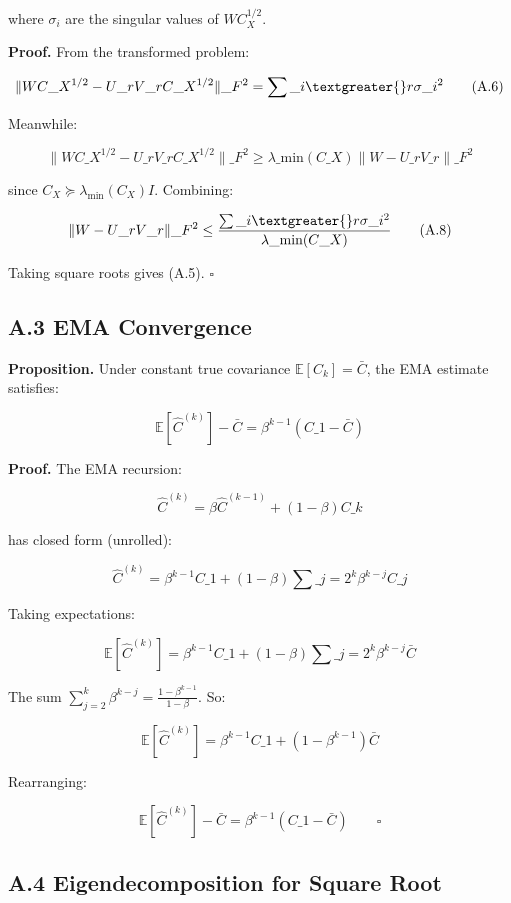 where $\sigma_i$ are the singular values of $W C_X^{1/2}$.

\textbf{Proof.} From the transformed problem:

\[
\|W C\_X^{1/2} - U\_r V\_r C\_X^{1/2}\|\_F^2 = \sum\_{i \textgreater{} r} \sigma\_i^2
\tag{A.6}
\]

Meanwhile:

\[
\|W C\_X^{1/2} - U\_r V\_r C\_X^{1/2}\|\_F^2 \geq \lambda\_\text{min}(C\_X) \|W - U\_r V\_r\|\_F^2
\tag{A.7}
\]

since $C_X \succeq \lambda_\text{min}(C_X) I$. Combining:

\[
\|W - U\_r V\_r\|\_F^2 \leq \frac{\sum\_{i \textgreater{} r} \sigma\_i^2}{\lambda\_\text{min}(C\_X)}
\tag{A.8}
\]

Taking square roots gives (A.5). $\square$

\subsection{A.3 EMA Convergence}

\textbf{Proposition.} Under constant true covariance $\mathbb{E}[C_k] = \bar{C}$, 
the EMA estimate satisfies:

\[
\mathbb{E}[\hat{C}^{(k)}] - \bar{C} = \beta^{k-1} (C\_1 - \bar{C})
\tag{A.9}
\]

\textbf{Proof.} The EMA recursion:

\[
\hat{C}^{(k)} = \beta \hat{C}^{(k-1)} + (1-\beta) C\_k
\]

has closed form (unrolled):

\[
\hat{C}^{(k)} = \beta^{k-1} C\_1 + (1-\beta) \sum\_{j=2}^{k} \beta^{k-j} C\_j
\]

Taking expectations:

\[
\mathbb{E}[\hat{C}^{(k)}] = \beta^{k-1} C\_1 + (1-\beta) \sum\_{j=2}^{k} \beta^{k-j} \bar{C}
\]

The sum $\sum_{j=2}^{k} \beta^{k-j} = \frac{1 - \beta^{k-1}}{1 - \beta}$. So:

\[
\mathbb{E}[\hat{C}^{(k)}] = \beta^{k-1} C\_1 + (1 - \beta^{k-1}) \bar{C}
\]

Rearranging:

\[
\mathbb{E}[\hat{C}^{(k)}] - \bar{C} = \beta^{k-1} (C\_1 - \bar{C}) \qquad \square
\]

\subsection{A.4 Eigendecomposition for Square Root}

